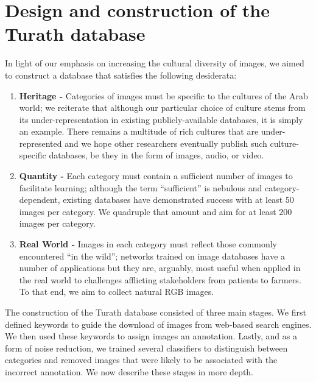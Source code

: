 \documentclass{article}
\begin{document}
\section{Design and construction of the Turath database}
\label{section:construction}

In light of our emphasis on increasing the cultural diversity of images, we aimed to construct a database that satisfies the following desiderata:

\begin{enumerate}[leftmargin=0.4cm]
    \item \textbf{Heritage - }Categories of images must be specific to the cultures of the Arab world; we reiterate that although our particular choice of culture stems from its under-representation in existing publicly-available databases, it is simply an example. There remains a multitude of rich cultures that are under-represented and we hope other researchers eventually publish such culture-specific databases, be they in the form of images, audio, or video. 
    \item \textbf{Quantity - }Each category must contain a sufficient number of images to facilitate learning; although the term \enquote{sufficient} is nebulous and category-dependent, existing databases have demonstrated success with at least 50 images per category. We quadruple that amount and aim for at least 200 images per category.
    \item \textbf{Real World - }Images in each category must reflect those commonly encountered \enquote{in the wild}; networks trained on image databases have a number of applications but they are, arguably, most useful when applied in the real world to challenges afflicting stakeholders from patients to farmers. To that end, we aim to collect natural RGB images.
\end{enumerate}



The construction of the Turath database consisted of three main stages. We first defined keywords to guide the download of images from web-based search engines. We then used these keywords to assign images an annotation. Lastly, and as a form of noise reduction, we trained several classifiers to distinguish between categories and removed images that were likely to be associated with the incorrect annotation. We now describe these stages in more depth.
\end{document}
